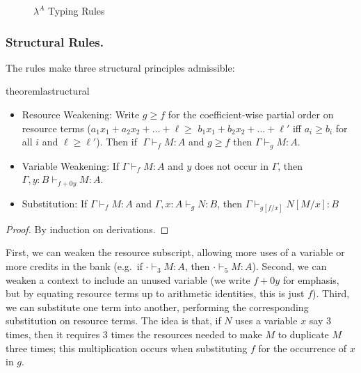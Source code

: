 \begin{figure}
  \vspace{-0.2in}
  \caption{$\lambda^A$ Typing Rules}
  \label{fig:la-ty-rules}
\end{figure}

\subsubsection{Structural Rules.}

The rules make three structural principles admissible:

\begin{restatable}{theorem}{lastructural} \label{thm:la-structural}\hfill
  \begin{itemize}
\item Resource Weakening: Write $g \ge f$ for the coefficient-wise
  partial order on resource terms ($a_1 x_1 + a_2 x_2 + \ldots + \ell
  \ge$ $b_1 x_1 + b_2 x_2 + \ldots + \ell'$ iff $a_i \ge b_i$ for all
  $i$ and $\ell \ge \ell'$).  Then if $\; \Gamma \vdash_f M : A$ and $g
  \geq f$ then $\Gamma \vdash_g M : A$.

\item Variable Weakening:
If $\Gamma \vdash_f M : A$ and $y$ does not occur in $\Gamma$, then $\Gamma,y:B \vdash_{f+0y} M : A$.
  
\item
    Substitution: 
If $\Gamma \vdash_f M : A$ and $\Gamma, x : A \vdash_g N : B$, then
$\Gamma \vdash_{g[f/x]} N[M/x] : B$

  \end{itemize}
\end{restatable}
\begin{proof}
By induction on derivations.
\end{proof}

First, we can weaken the resource subscript, allowing more uses of a
variable or more credits in the bank (e.g.\ if $\cdot \vdash_3 M : A$,
then $\cdot \vdash_5 M : A$).  Second, we can weaken a context
to include an unused variable (we write $f+0y$ for emphasis, but by
equating resource terms up to arithmetic identities, this is just $f$).
Third, we can substitute one term into another, performing the
corresponding substitution on resource terms.  The idea is that, if $N$
uses a variable $x$ say $3$ times, then it requires 3 times the
resources needed to make $M$ to duplicate $M$ three times; this
multiplication occurs when substituting $f$ for the occurrence of $x$ in
$g$.

